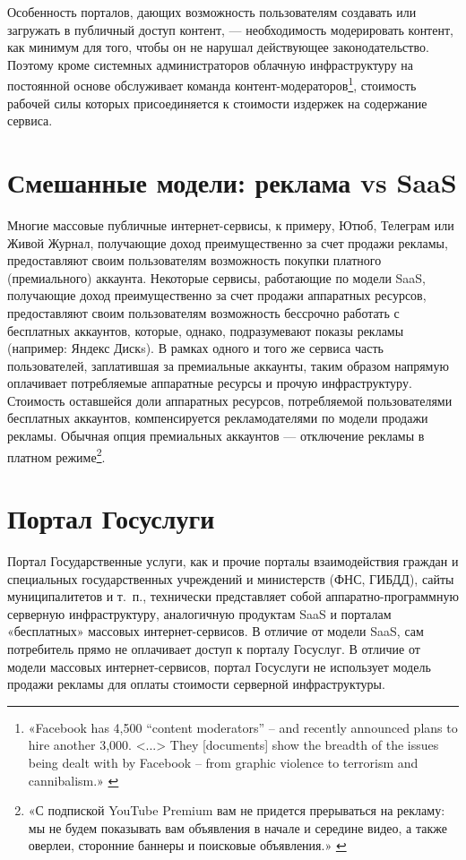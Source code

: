 \documentclass{article}
\begin{document}
Особенность порталов, дающих возможность пользователям создавать или загружать в публичный доступ контент, — необходимость модерировать контент, как минимум для того, чтобы он не нарушал действующее законодательство. Поэтому кроме системных администраторов облачную инфраструктуру на постоянной основе обслуживает команда контент-модераторов\footnote{«Facebook has 4,500 “content moderators” – and recently announced plans to hire another 3,000. <...> They [documents] show the breadth of the issues being dealt with by Facebook – from graphic violence to terrorism and cannibalism.» \cite{facebookModerators}}, стоимость рабочей силы которых присоединяется к стоимости издержек на содержание сервиса.

\section*{Смешанные модели: реклама vs SaaS}

Многие массовые публичные интернет-сервисы, к примеру, Ютюб, Телеграм или Живой Журнал, получающие доход преимущественно за счет продажи рекламы, предоставляют своим пользователям возможность покупки платного (премиального) аккаунта. Некоторые сервисы, работающие по модели SaaS, получающие доход преимущественно за счет продажи аппаратных ресурсов, предоставляют своим пользователям возможность бессрочно работать с бесплатных аккаунтов, которые, однако, подразумевают показы рекламы (например: Яндекс Дискs). В рамках одного и того же сервиса часть пользователей, заплатившая за премиальные аккаунты, таким образом напрямую оплачивает потребляемые аппаратные ресурсы и прочую инфраструктуру. Стоимость оставшейся доли аппаратных ресурсов, потребляемой пользователями бесплатных аккаунтов, компенсируется рекламодателями по модели продажи рекламы. Обычная опция премиальных аккаунтов — отключение рекламы в платном режиме\footnote{«С подпиской YouTube Premium вам не придется прерываться на рекламу: мы не будем показывать вам объявления в начале и середине видео, а также оверлеи, сторонние баннеры и поисковые объявления.» \cite{youtubePremium}}.

\section*{Портал Госуслуги}

Портал Государственные услуги, как и прочие порталы взаимодействия граждан и специальных государственных учреждений и министерств (ФНС, ГИБДД), сайты муниципалитетов и т.~п., технически представляет собой аппаратно-программную серверную инфраструктуру, аналогичную продуктам SaaS и порталам «бесплатных» массовых интернет-сервисов. В отличие от модели SaaS, сам потребитель прямо не оплачивает доступ к порталу Госуслуг. В отличие от модели массовых интернет-сервисов, портал Госуслуги не использует модель продажи рекламы для оплаты стоимости серверной инфраструктуры.
\end{document}
